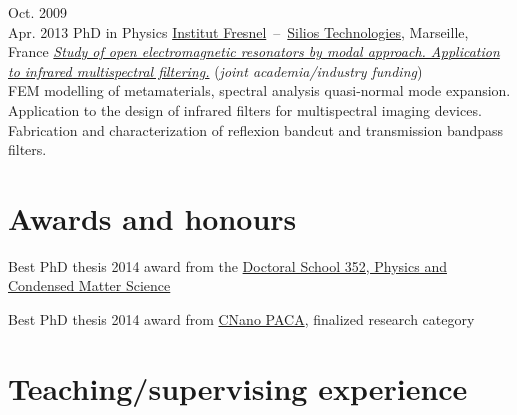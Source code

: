 \documentclass{cv}
\begin{document}
\begin{entrylist}
	\entry
	{Oct. 2009\\Apr. 2013}
	{PhD in Physics}
	{\href{http://www.fresnel.fr/}{Institut Fresnel}~--~\href{http://www.silios.com/}{Silios Technologies}, Marseille, France}
	{\emph{\href{http://tel.archives-ouvertes.fr/index.php?halsid=slas337fv1oqlj1okgkq7q42i5&view_this_doc=tel-00918651&version=1}
			{Study of open electromagnetic resonators by modal approach.
				Application to infrared multispectral filtering.}} (\emph{joint academia/industry funding})\\
		FEM modelling of metamaterials, spectral analysis quasi-normal mode expansion.
		Application to the design of infrared filters for multispectral imaging devices.
		Fabrication and characterization of reflexion bandcut and transmission bandpass filters.
	}

\end{entrylist}


\section{Awards and honours}

  {Best PhD thesis 2014 award} from the {\href{https://ecole-doctorale-352.univ-amu.fr/en}{Doctoral School 352, Physics and Condensed Matter Science}}

  {Best PhD thesis 2014 award from {\href{https://www.cnano-paca.fr/index.php?option=com_content&view=article&id=80}{CNano PACA}}, finalized research category}





\newpage



\vspace*{-0.2cm}
\section{Teaching/supervising experience}
\end{document}
